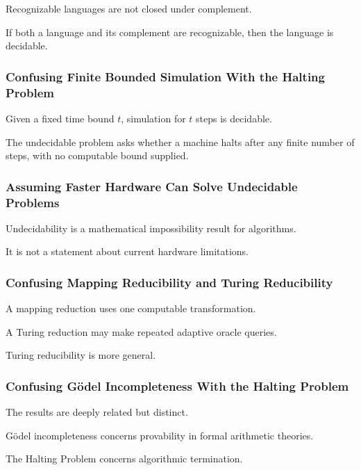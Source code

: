 Recognizable languages are not closed under complement.

If both a language and its complement are recognizable, then the language
is decidable.

\subsubsection{Confusing Finite Bounded Simulation With the Halting Problem}

Given a fixed time bound \(t\), simulation for \(t\) steps is decidable.

The undecidable problem asks whether a machine halts after any finite number
of steps, with no computable bound supplied.

\subsubsection{Assuming Faster Hardware Can Solve Undecidable Problems}

Undecidability is a mathematical impossibility result for algorithms.

It is not a statement about current hardware limitations.

\subsubsection{Confusing Mapping Reducibility and Turing Reducibility}

A mapping reduction uses one computable transformation.

A Turing reduction may make repeated adaptive oracle queries.

Turing reducibility is more general.

\subsubsection{Confusing Gödel Incompleteness With the Halting Problem}

The results are deeply related but distinct.

Gödel incompleteness concerns provability in formal arithmetic theories.

The Halting Problem concerns algorithmic termination.

